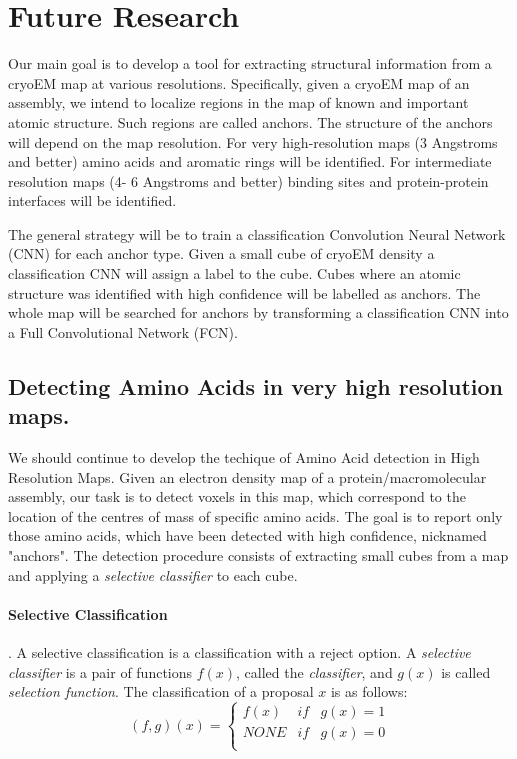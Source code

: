 \section{Future Research }
Our main goal is to develop a tool for extracting structural information from a cryoEM map at various resolutions.
Specifically, given a cryoEM map of an assembly, we intend to localize regions in the map of known and important atomic structure.
Such regions are called anchors.
The structure of the anchors will depend on the map resolution.
For very high-resolution maps (3 Angstroms and better) amino acids and aromatic rings will be identified. 
For intermediate  resolution maps (4- 6 Angstroms and better)  binding sites and protein-protein interfaces will be identified.

The general strategy will be to train a classification Convolution Neural Network (CNN) for each anchor type. Given a small cube of cryoEM  density a  classification CNN  will assign a label to the cube. 
Cubes where an atomic structure was identified with high confidence will be labelled as anchors.  The whole map will be searched for anchors by transforming a classification CNN into a Full Convolutional Network (FCN).
\subsection{Detecting Amino Acids in very high resolution maps.}\label{s:aa_task}
We should continue to develop the techique of Amino Acid detection in High Resolution Maps.
Given an electron density map of a protein/macromolecular assembly, our task is to detect voxels in this map, which correspond to the location of the centres of mass of specific amino acids.
The goal is to report only those amino acids, which have been detected with high confidence, nicknamed "anchors".
The detection procedure consists of  extracting small cubes from a map and applying  a \textit{selective classifier}  to each cube.
\paragraph{Selective Classification}. A selective classification is a classification with a reject option. A \textit{selective classifier} is a pair of functions $f(x)$, called the \textit{classifier}, and $g(x)$ is  called \textit{selection  function}. The classification of a proposal $x$ is as follows:
\begin{equation}
(f,g)(x) = \left\{ \begin{array}{lcl}
f(x) & if & g(x) = 1 \\
NONE & if & g(x) = 0 \\
\end{array}
\right.
\end{equation}

